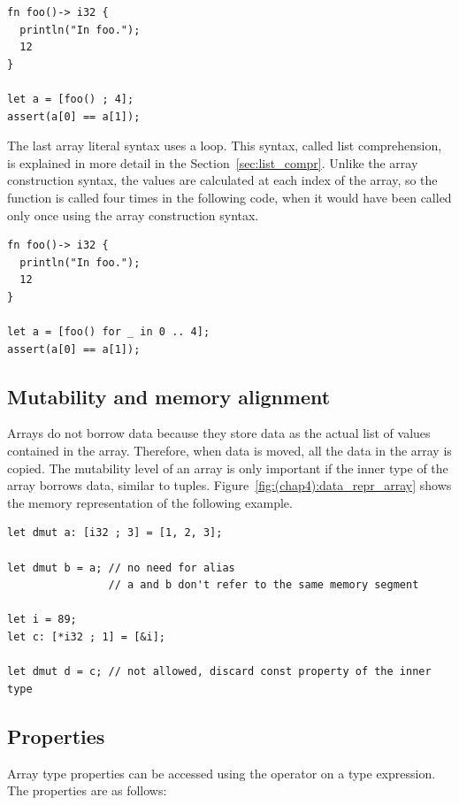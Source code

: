 \begin{lstlisting}[style=coloredverbatim]
fn foo()-> i32 {
  println("In foo.");
  12
}

let a = [foo() ; 4];
assert(a[0] == a[1]);
\end{lstlisting}

\smallskip
The last array literal syntax uses a  loop. This syntax, called list
comprehension, is explained in more detail in the Section~\ref{sec:list_compr}.
Unlike the array construction syntax, the values are calculated at each index of
the array, so the function is called four times in the following code, when it
would have been called only once using the array construction syntax.

\begin{lstlisting}[style=coloredverbatim]
fn foo()-> i32 {
  println("In foo.");
  12
}

let a = [foo() for _ in 0 .. 4];
assert(a[0] == a[1]);
\end{lstlisting}


\subsection {Mutability and memory alignment}
Arrays do not borrow data because they store data as the actual list of values
contained in the array. Therefore, when data is moved, all the data in the array
is copied. The mutability level of an array is only important if the inner type
of the array borrows data, similar to tuples. Figure~\ref{fig:(chap4):data_repr_array}
shows the memory representation of the following example.

\begin{lstlisting}[style=coloredverbatimError]
let dmut a: [i32 ; 3] = [1, 2, 3];

let dmut b = a; // no need for alias
                // a and b don't refer to the same memory segment

let i = 89;
let c: [*i32 ; 1] = [&i];

let dmut d = c; // not allowed, discard const property of the inner type
\end{lstlisting}



\subsection {Properties}

Array type properties can be accessed using the \token{::} operator on a type
expression. The properties are as follows:


